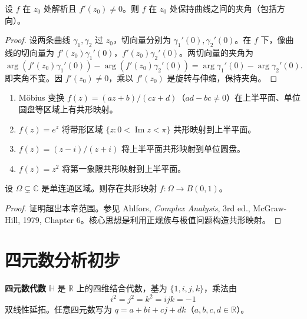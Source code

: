\begin{proposition}[共形映射的保角性]\label{prop:ca_conformal_angle_preserving}
设 $f$ 在 $z_0$ 处解析且 $f'(z_0) \neq 0$。则 $f$ 在 $z_0$ 处保持曲线之间的夹角（包括方向）。
\end{proposition}

\begin{proof}
设两条曲线 $\gamma_1, \gamma_2$ 过 $z_0$，切向量分别为 $\gamma_1'(0), \gamma_2'(0)$。在 $f$ 下，像曲线的切向量为 $f'(z_0) \gamma_1'(0)$，$f'(z_0) \gamma_2'(0)$。两切向量的夹角为
\[
\arg(f'(z_0) \gamma_1'(0)) - \arg(f'(z_0) \gamma_2'(0)) = \arg \gamma_1'(0) - \arg \gamma_2'(0).
\]
即夹角不变。因 $f'(z_0) \neq 0$，乘以 $f'(z_0)$ 是旋转与伸缩，保持夹角。
\end{proof}

\begin{example}[共形映射的实例]\label{ex:ca_conformal_examples}
\begin{enumerate}[label=(\roman*)]
    \item Möbius 变换 $f(z) = (az + b)/(cz + d)$（$ad - bc \neq 0$）在上半平面、单位圆盘等区域上有共形映射。
    \item $f(z) = e^z$ 将带形区域 $\{z : 0 < \operatorname{Im} z < \pi\}$ 共形映射到上半平面。
    \item $f(z) = (z - i)/(z + i)$ 将上半平面共形映射到单位圆盘。
    \item $f(z) = z^2$ 将第一象限共形映射到上半平面。
\end{enumerate}
\end{example}

\begin{theorem}\label{thm:ca_riemann_mapping}
设 $\Omega \subsetneq \mathbb{C}$ 是单连通区域。则存在共形映射 $f: \Omega \to B(0, 1)$。
\end{theorem}

\begin{proof}
证明超出本章范围。参见 Ahlfors, \textit{Complex Analysis}, 3rd ed., McGraw-Hill, 1979, Chapter 6。核心思想是利用正规族与极值问题构造共形映射。
\end{proof}

\section{四元数分析初步}

\begin{definition}[四元数代数]\label{def:ca_quaternion_algebra}
\textbf{四元数代数} $\mathbb{H}$ 是 $\mathbb{R}$ 上的四维结合代数，基为 $\{1, i, j, k\}$，乘法由
\[
i^2 = j^2 = k^2 = ijk = -1
\]
双线性延拓。任意四元数写为 $q = a + bi + cj + dk$（$a, b, c, d \in \mathbb{R}$）。
\end{definition}

